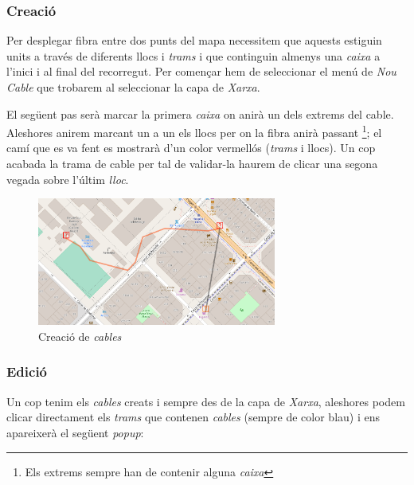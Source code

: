 \documentclass[a4paper]{article}
\begin{document}
	\subsubsection{Creació}
	Per desplegar fibra entre dos punts del mapa necessitem que aquests estiguin units a través de diferents llocs i \emph{trams} i que continguin almenys una \emph{caixa} a l'inici i al final del recorregut.
	Per començar hem de seleccionar el menú de \emph{Nou Cable} que trobarem al seleccionar la capa de \emph{Xarxa}.
	
	El següent pas serà marcar la primera \emph{caixa} on anirà un dels extrems del cable. Aleshores anirem marcant un a un els llocs per on la fibra anirà passant \footnote{Els extrems sempre han de contenir alguna \emph{caixa}}; el camí que es va fent es mostrarà d'un color vermellós (\emph{trams} i llocs). Un cop acabada la trama de cable per tal de validar-la haurem de clicar una segona vegada sobre l'últim \emph{lloc}.
	
	\begin{figure}[H]
		\centering
		\includegraphics[width=0.7\textwidth]{images/cable_creation.png}
		\caption{Creació de \emph{cables}}
	\end{figure}
	
	\subsubsection{Edició}
	
	Un cop tenim els \emph{cables} creats i sempre des de la capa de \emph{Xarxa}, aleshores podem clicar directament els \emph{trams} que contenen \emph{cables} (sempre de color blau) i ens apareixerà el següent \emph{popup}:
	
\end{document}
